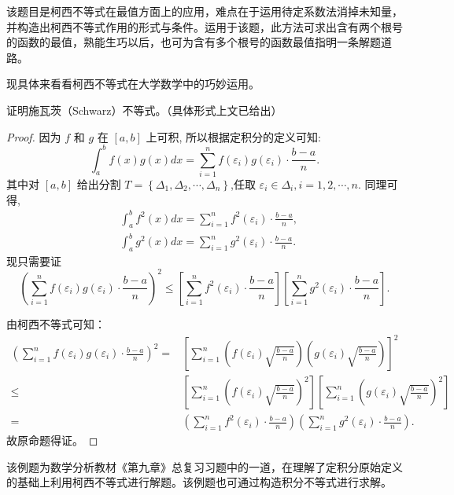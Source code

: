 \begin{analysis}
  该题目是柯西不等式在最值方面上的应用，难点在于运用待定系数法消掉未知量，并构造出柯西不等式作用的形式与条件。运用于该题，此方法可求出含有两个根号的函数的最值，熟能生巧以后，也可为含有多个根号的函数最值指明一条解题道路。
\end{analysis}


现具体来看看柯西不等式在大学数学中的巧妙运用。


\begin{example}
  \parencite{华东师大数学分析} 证明施瓦茨（Schwarz）不等式。（具体形式上文已给出） 
\end{example}


\begin{proof}
  因为 $f$ 和 $g$ 在 $[a, b]$ 上可积, 所以根据定积分的定义可知:
  \[
  \int_{a}^{b} f(x) g(x) d x=\sum_{i=1}^{n} f\left(\varepsilon_{i}\right) g\left(\varepsilon_{i}\right) \cdot \frac{b-a}{n}.
  \]
  其中对 $[a, b]$ 给出分割 $T=\left\{\Delta_{1}, \Delta_{2}, \cdots, \Delta_{n}\right\}$,任取 $\varepsilon_{i} \in \Delta_{i}, i=1,2, \cdots, n.$
  同理可得,
  \[
  \begin{aligned}
  &\int_{a}^{b} f^{2}(x) d x=\sum_{i=1}^{n} f^{2}\left(\varepsilon_{i}\right) \cdot \frac{b-a}{n}, \\
  &\int_{a}^{b} g^{2}(x) d x=\sum_{i=1}^{n} g^{2}\left(\varepsilon_{i}\right) \cdot \frac{b-a}{n}.
  \end{aligned}
  \]
  现只需要证 \[\left(\sum_{i=1}^{n} f\left(\varepsilon_{i}\right) g\left(\varepsilon_{i}\right) \cdot \frac{b-a}{n}\right)^{2} \leq\left[\sum_{i=1}^{n} f^{2}\left(\varepsilon_{i}\right) \cdot \frac{b-a}{n}\right]\left[\sum_{i=1}^{n} g^{2}\left(\varepsilon_{i}\right) \cdot \frac{b-a}{n}\right].\]

  由柯西不等式可知：
  \[
    \begin{aligned} 
    \left(\sum_{i=1}^{n} f\left(\varepsilon_{i}\right) g\left(\varepsilon_{i}\right) \cdot \frac{b-a}{n}\right)^{2}=&\left[\sum_{i=1}^{n}\left(f\left(\varepsilon_{i}\right) \sqrt{\frac{b-a}{n}}\right)\left(g\left(\varepsilon_{i}\right) \sqrt{\frac{b-a}{n}}\right)\right]^{2} \\ 
    \leq &\left[\sum_{i=1}^{n}\left(f\left(\varepsilon_{i}\right) \sqrt{\frac{b-a}{n}}\right)^{2}\right]\left[\sum_{i=1}^{n}\left(g\left(\varepsilon_{i}\right) \sqrt{\frac{b-a}{n}}\right)^{2}\right]\\
    =& {\left(\sum_{i=1}^{n} f^{2}\left(\varepsilon_{i}\right) \cdot \frac{b-a}{n}\right)\left(\sum_{i=1}^{n} g^{2}\left(\varepsilon_{i}\right) \cdot \frac{b-a}{n}\right) }.
  \end{aligned}\]
  故原命题得证。
\end{proof}


\begin{analysis}
  该例题为数学分析教材《第九章》总复习习题中的一道，在理解了定积分原始定义的基础上利用柯西不等式进行解题。该例题也可通过构造积分不等式进行求解。
\end{analysis}